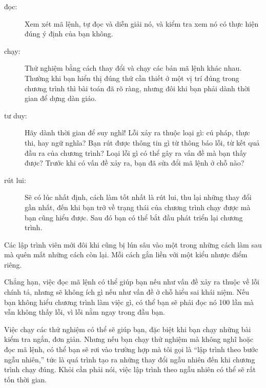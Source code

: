 \documentclass[11pt]{book}
\begin{document}
\begin{description}

\item[đọc:] Xem xét mã lệnh, tự đọc và diễn giải nó, và kiểm tra xem
nó có thực hiện đúng ý định của bạn không.

\item[chạy:] Thử nghiệm bằng cách thay đổi và chạy các bản mã lệnh
khác nhau. Thường khi bạn hiển thị đúng thứ cần thiết ở một vị trí đúng
trong chương trình thì bài toán đã rõ ràng, nhưng đôi khi bạn phải
dành thời gian để dựng dàn giáo.

\item[tư duy:] Hãy dành thời gian để suy nghĩ! Lỗi xảy ra thuộc loại gì:
cú pháp, thực thi, hay ngữ nghĩa? Bạn rút được thông tin gì từ thông báo lỗi,
từ kết quả đầu ra của chương trình? Loại lỗi gì có thể gây ra vấn đề
mà bạn thấy được? Trước khi có vấn đề xảy ra, bạn đã sửa đổi mã lệnh
ở chỗ nào?

\item[rút lui:] Sẽ có lúc nhất định, cách làm tốt nhất là rút lui, thu lại những
thay đổi gần nhất, đến khi bạn trở về trạng thái của chương trình chạy được
mà bạn cũng hiểu được. Sau đó bạn có thể bắt đầu phát triển lại chương trình.

\end{description}

Các lập trình viên mới đôi khi cũng bị lún sâu vào một trong những cách
làm sau mà quên mất những cách còn lại. Mỗi cách gắn liền với một
kiểu nhược điểm riêng.


Chẳng hạn, việc đọc mã lệnh có thể giúp bạn nếu như vấn đề xảy ra 
thuộc về lỗi chính tả, nhưng sẽ không ích gì nếu như vấn đề ở chỗ hiểu sai
khái niệm. Nếu bạn không hiểu chương trình làm việc gì, có thể bạn sẽ
phải đọc nó 100 lần mà vẫn không thấy lỗi, vì lỗi nằm ngay trong đầu bạn.


Việc chạy các thử nghiệm có thể sẽ giúp bạn, đặc biệt khi bạn chạy
những bài kiểm tra ngắn, đơn giản. Nhưng nếu bạn chạy thử nghiệm mà
không nghĩ hoặc đọc mã lệnh, có thể bạn sẽ rơi vào trường hợp 
mà tôi gọi là ``lập trình theo bước ngẫu nhiên,'' tức là quá trình
tạo ra những thay đổi ngẫu nhiên đến khi chương trình chạy đúng.
Khỏi cần phải nói, việc lập trình theo ngẫu nhiên có thể sẽ rất tốn thời gian.

\end{document}
